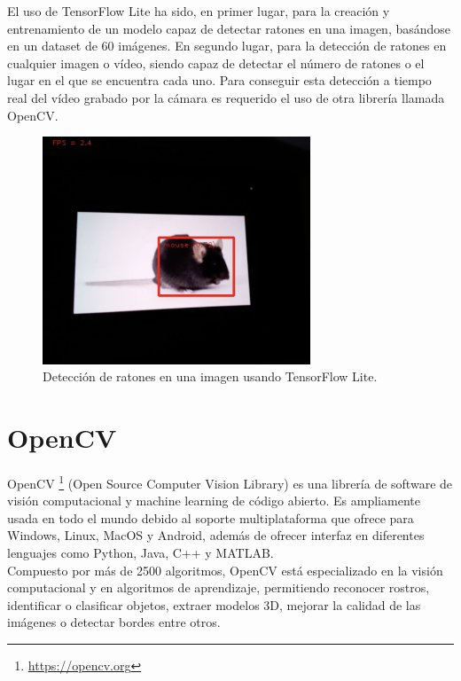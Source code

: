 El uso de TensorFlow Lite ha sido, en primer lugar, para la creación y entrenamiento de un modelo capaz de detectar ratones en una imagen, basándose en un dataset de 60 imágenes. En segundo lugar, para la detección de ratones en cualquier imagen o vídeo, siendo capaz de detectar el número de ratones o el lugar en el que se encuentra cada uno. Para conseguir esta detección a tiempo real del vídeo grabado por la cámara es requerido el uso de otra librería llamada OpenCV.\\
\begin{figure} [h!]
  \begin{center}
    \includegraphics[width=8cm]{figs/raton-detectado}
  \end{center}
  \caption{Detección de ratones en una imagen usando TensorFlow Lite.}
  \label{fig:tesla}
\end{figure}

\section{OpenCV}
\label{sec:opencv}
OpenCV \footnote{\url{https://opencv.org}} (Open Source Computer Vision Library) es una librería de software de visión computacional y machine learning de código abierto. Es ampliamente usada en todo el mundo debido al soporte multiplataforma que ofrece para Windows, Linux, MacOS y Android, además de ofrecer interfaz en diferentes lenguajes como Python, Java, C++ y MATLAB.\\

Compuesto por más de 2500 algoritmos, OpenCV está especializado en la visión computacional y en algoritmos de aprendizaje, permitiendo reconocer rostros, identificar o clasificar objetos, extraer modelos 3D, mejorar la calidad de las imágenes o detectar bordes entre otros.\\

